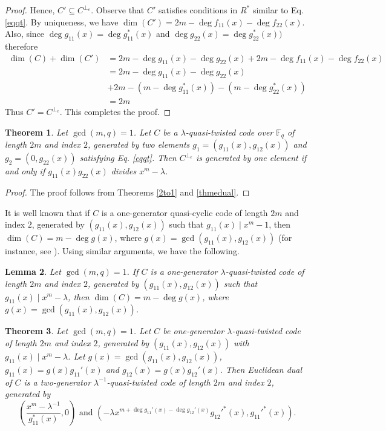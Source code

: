 \documentclass[12 pt]{extarticle}
\numberwithin{equation}{section}
\newtheorem{theorem}{Theorem}[section]
\newtheorem{lemma}[theorem]{Lemma}
\theoremstyle{definition}
\begin{document}
\begin{proof}
    Hence, $C'\subseteq C^{\perp_e}$. Observe that $C'$ satisfies conditions in $R^*$ similar to Eq. \ref{eqqt}. 
By uniqueness, we have  $\dim (C')=2m-\deg f_{11}(x)-\deg f_{22}(x)$. Also,  since  $\deg g_{11}(x)=\deg g^*_{11}(x)$  and  $\deg g_{22}(x)=\deg g^*_{22}(x))$ therefore
    \begin{equation*}
        \begin{split}
            \dim(C)+\dim(C')&=2m-\deg g_{11}(x)-\deg g_{22}(x)+2m-\deg f_{11}(x)-\deg f_{22}(x)\\
            &=2m-\deg g_{11}(x)-\deg g_{22}(x)\\
            &+2m- (m-\deg g^*_{11}(x))- (m-\deg g^*_{22}(x))\\
            &=2m\  
        \end{split}
    \end{equation*}
Thus $C'=C^{\perp_e}$. This completes the proof.
\end{proof}

 \begin{theorem}
   Let $\gcd(m,q)=1$. Let $C$ be a $\lambda$-quasi-twisted code over $\mathbb{F}_q$ of length $2m$ and index $2$, generated by two elements $g_1=(g_{11}(x),g_{12}(x))$ and $g_2=(0,g_{22}(x))$ satisfying Eq. \ref{eqqt}. Then $C^{\perp_e}$ is generated by one element if and only if $g_{11}(x)g_{22}(x)$ divides $x^m-\lambda$.  
 \end{theorem}
 \begin{proof}
   The proof follows from Theorems \ref{2to1} and \ref{thmedual}.
 \end{proof}

It is well known that if $C$ is a one-generator quasi-cyclic code of length $2m$ and index $2$, generated by $(g_{11}(x),g_{12}(x))$ such that $g_{11}(x)\mid x^m-1$, then $\dim (C)=m-\deg g(x)$, where $g(x)=\gcd(g_{11}(x),g_{12}(x))$ (for instance, see \cite[Lemma 1]{Seguin2004}). Using similar arguments, we have the following.

\begin{lemma}
  Let $\gcd(m,q)=1$.  If $C$  is a one-generator $\lambda$-quasi-twisted code of length $2m$ and index $2$, generated by $(g_{11}(x),g_{12}(x))$ such that $g_{11}(x)\mid x^m-\lambda$, then $\dim (C)=m-\deg g(x)$, where $g(x)=\gcd(g_{11}(x),g_{12}(x))$.
\end{lemma} 



\begin{theorem}\label{gen1edaul}
Let $\gcd(m,q)=1$. Let $C$ be one-generator $\lambda$-quasi-twisted code of length $2m$ and index $2$, generated by $(g_{11}(x),g_{12}(x))$ with $g_{11}(x)\mid x^m-\lambda$. Let $g(x)=\gcd(g_{11}(x),g_{12}(x))$, $g_{11}(x)=g(x)g_{11}'(x)$ and $g_{12}(x)=g(x)g_{12}'(x)$. Then Euclidean dual of $C$ is a two-generator $\lambda^{-1}$-quasi-twisted code of length $2m$ and index $2$, generated by 
 $$\left (\frac{x^m-\lambda^{-1}}{g_{11}^*(x)},0\right ) \text{ and } (-\lambda x^{m+\deg g_{11}'(x)-\deg g_{12}'(x)}g_{12}'^*(x),g_{11}'^*(x)).$$
 
\end{theorem}
\end{document}
